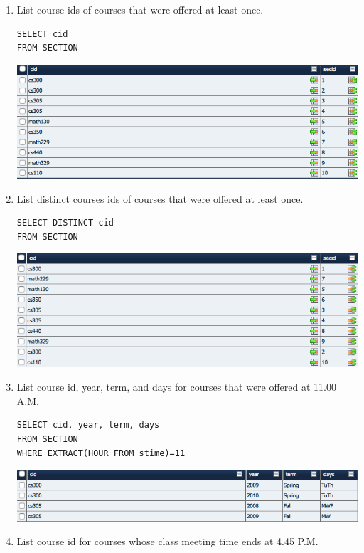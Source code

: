 \documentclass[11pt]{article}
\begin{document}
\begin{enumerate}
\item List course ids of courses that were offered at least once.

\begin{verbatim}
SELECT cid
FROM SECTION
\end{verbatim}

\includegraphics[scale=0.5]{11.png}

\item List distinct courses ids of courses that were offered at least once.

\begin{verbatim}
SELECT DISTINCT cid
FROM SECTION
\end{verbatim}

\includegraphics[scale=0.5]{12.png}

\item List course id, year, term, and days for courses that were offered at 11.00 A.M.

\begin{verbatim}
SELECT cid, year, term, days
FROM SECTION
WHERE EXTRACT(HOUR FROM stime)=11
\end{verbatim}

\includegraphics[scale=0.5]{13.png}

\item List course id for courses whose class meeting time ends at 4.45 P.M.


\end{enumerate}
\end{document}
